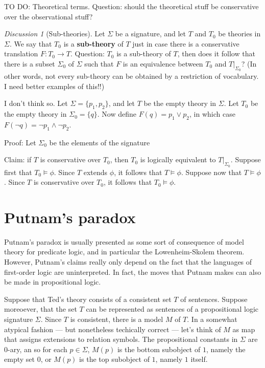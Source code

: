 \documentclass[11pt]{article}
\theoremstyle{definition}
\theoremstyle{remark}
\newtheorem*{disc}{Discussion}
\begin{document}
TO DO: Theoretical terms.  Question: should the theoretical stuff be
conservative over the observational stuff?

\begin{disc}[Sub-theories] Let $\Sigma$ be a signature, and let $T$
  and $T_0$ be theories in $\Sigma$.  We say that $T_0$ is a
  \textbf{sub-theory} of $T$ just in case there is a conservative
  translation $F:T_0\to T$.  Question: $T_0$ is a sub-theory of $T$,
  then does it follow that there is a subset $\Sigma _0$ of $\Sigma$
  such that $F$ is an equivalence between $T_0$ and $T|_{\Sigma _0}$?
  (In other words, not every sub-theory can be obtained by a
  restriction of vocabulary.  I need better examples of this!!)

  I don't think so.  Let $\Sigma = \{ p_1,p_2\}$, and let $T$ be the
  empty theory in $\Sigma$.  Let $T_0$ be the empty theory in $\Sigma
  _0=\{ q\}$.  Now define $F(q)=p_1\vee p_2$, in which case $F(\neg
  q)=\neg p_1\wedge \neg p_2$.

  Proof: Let $\Sigma _0$ be the elements of the signature



  Claim: if $T$ is conservative over $T_0$, then $T_0$ is logically
  equivalent to $T|_{\Sigma _0}$.  Suppose first that $T_0\vDash
  \phi$.  Since $T$ extends $\phi$, it follows that $T\vDash \phi$.
  Suppose now that $T\vDash \phi$.  Since $T$ is conservative over
  $T_0$, it follows that $T_0\vDash\phi$.






\end{disc}



\section{Putnam's paradox}




Putnam's paradox is usually presented as some sort of consequence of
model theory for predicate logic, and in particular the
Lowenheim-Skolem theorem.  However, Putnam's claims really only depend
on the fact that the languages of first-order logic are uninterpreted.
In fact, the moves that Putnam makes can also be made in propositional
logic.

Suppose that Ted's theory consists of a consistent set $T$ of
sentences.  Suppose moreoever, that the set $T$ can be represented as
sentences of a propositional logic signature $\Sigma$.  Since $T$ is
consistent, there is a model $M$ of $T$.  In a somewhat atypical
fashion --- but nonetheless techically correct --- let's think of $M$
as map that assigns extensions to relation symbols.  The propositional
constants in $\Sigma$ are $0$-ary, an so for each $p\in \Sigma$,
$M(p)$ is the bottom subobject of $1$, namely the empty set $0$, or
$M(p)$ is the top subobject of $1$, namely $1$ itself.
\end{document}

